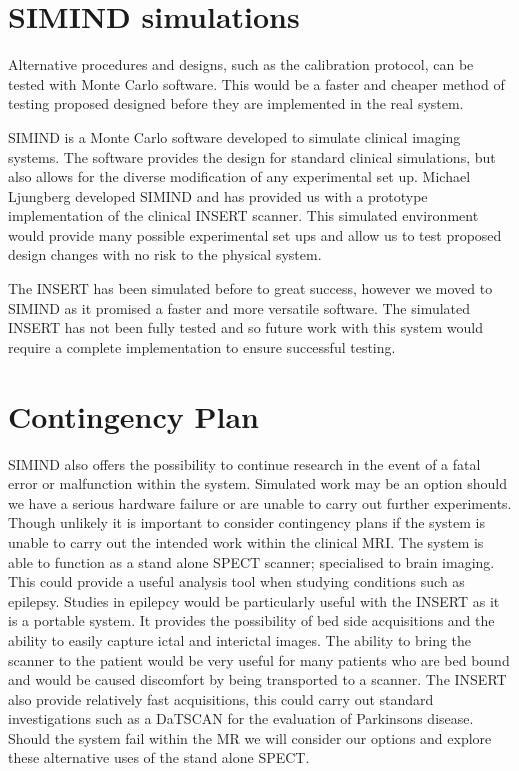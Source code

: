 \section{SIMIND simulations}
Alternative procedures and designs, such as the calibration protocol, can be tested with Monte Carlo software. This would be a faster and cheaper method of testing proposed designed before they are implemented in the real system. 

SIMIND is a Monte Carlo software developed to simulate clinical imaging systems. The software provides the design for standard clinical simulations, but also allows for the diverse modification of any experimental set up. Michael Ljungberg developed SIMIND and has provided us with a prototype implementation of the clinical \acrshort{INSERT} scanner. This simulated environment would provide many possible experimental set ups and allow us to test proposed design changes with no risk to the physical system. 

The \acrshort{INSERT} has been simulated before to great success, however we moved to SIMIND as it promised a faster and more versatile software. The simulated \acrshort{INSERT} has not been fully tested and so future work with this system would require a complete implementation to ensure successful testing. 

\section{Contingency Plan}
SIMIND also offers the possibility to continue research in the event of a fatal error or malfunction within the system. Simulated work may be an option should we have a serious hardware failure or are unable to carry out further experiments. Though unlikely it is important to consider contingency plans if the system is unable to carry out the intended work within the clinical \acrshort{MRI}. The system is able to function as a stand alone \acrshort{SPECT} scanner; specialised to brain imaging. This could provide a useful analysis tool when studying conditions such as epilepsy. Studies in epilepcy would be particularly useful with the \acrshort{INSERT} as it is a portable system. It provides the possibility of bed side acquisitions and the ability to easily capture ictal and interictal images. The ability to bring the scanner to the patient would be very useful for many patients who are bed bound and would be caused discomfort by being transported to a scanner. The \acrshort{INSERT} also provide relatively fast acquisitions, this could carry out standard investigations such as a DaTSCAN for the evaluation of Parkinsons disease. Should the system fail within the \acrshort{MR} we will consider our options and explore these alternative uses of the stand alone \acrshort{SPECT}. 

